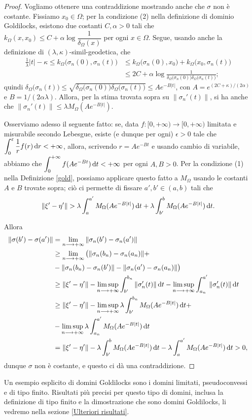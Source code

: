 \begin{proof}
    Vogliamo ottenere una contraddizione mostrando anche che $\sigma$ non è costante. Fissiamo $x_0\in\Omega$; per la condizione (2) nella definizione di dominio Goldilocks, esistono due costanti $C,\alpha>0$ tali che $k_\Omega(x,x_0) \le C+\alpha\log{\dfrac{1}{\delta_\Omega(x)}}$ per ogni $x\in\Omega$. Segue, usando anche la definizione di $(\lambda,\kappa)$-simil-geodetica, che
    \begin{align*}
        \frac{1}{\lambda}|t|-\kappa \le k_\Omega\big(\sigma_n(0),\sigma_n(t)\big) &\le k_\Omega\big(\sigma_n(0),x_0\big)+k_\Omega\big(x_0,\sigma_n(t)\big)\\
        &\le 2C+\alpha\log{\frac{1}{\delta_\Omega\big(\sigma_n(0)\big)\delta_\Omega\big(\sigma_n(t)\big)}};
    \end{align*}
    quindi $\delta_\Omega\big(\sigma_n(t)\big) \le \sqrt{\delta_\Omega\big(\sigma_n(0)\big)\delta_\Omega\big(\sigma_n(t)\big)} \le Ae^{-B|t|}$, con $A=e^{(2C+\kappa)/(2\alpha)}$ e $B=1/(2\alpha\lambda)$. Allora, per la stima trovata sopra su $\|\sigma_n'(t)\|$, si ha anche che $\|\sigma_n'(t)\| \le \lambda M_\Omega(Ae^{-B|t|})$.
    
    Osserviamo adesso il seguente fatto: se, data $f:[0,+\infty)\longrightarrow[0,+\infty)$ limitata e misurabile secondo Lebesgue, esiste (e dunque per ogni) $\epsilon>0$ tale che $\displaystyle \int_0^\varepsilon \frac{1}{r}f(r)\mathop{}\!\mathrm{d} r<+\infty$, allora, scrivendo $r=Ae^{-Bt}$ e usando cambio di variabile, abbiamo che $\displaystyle\int_0^{+\infty} f(Ae^{-Bt})\mathop{}\!\mathrm{d} t<+\infty$ per ogni $A,B>0$. Per la condizione (1) nella Definizione \ref{gold}, possiamo applicare questo fatto a $M_\Omega$ usando le costanti $A$ e $B$ trovate sopra; ciò ci permette di fissare $a',b'\in(a,b)$ tali che
    $$\|\xi'-\eta'\|>\lambda\int_a^{a'} M_\Omega(Ae^{-B|t|})\diff t+\lambda\int_{b'}^b M_\Omega(Ae^{-B|t|})\diff t.$$

    Allora
    \begin{align*}
        \|\sigma(b')-\sigma(a')\|&=\lim_{n\longrightarrow+\infty}\|\sigma_n(b')-\sigma_n(a')\| \\
        & \ge \lim_{n\longrightarrow+\infty}\big(\|\sigma_n(b_n)-\sigma_n(a_n)\|+\\
        &-\|\sigma_n(b_n)-\sigma_n(b')\|-\|\sigma_n(a')-\sigma_n(a_n)\|\big) \\
        &\ge \|\xi'-\eta'\|-\limsup_{n\longrightarrow+\infty}\int_{b'}^{b_n}\|\sigma_n'(t)\|\mathop{}\!\mathrm{d} t-\limsup_{n\longrightarrow+\infty}\int_{a_n}^{a'}\|\sigma_n'(t)\|\mathop{}\!\mathrm{d} t\\
        &\ge \|\xi'-\eta'\|-\limsup_{n\longrightarrow+\infty}\lambda\int_{b'}^{b_n}M_\Omega(Ae^{-B|t|})\mathop{}\!\mathrm{d} t+\\
        &-\limsup_{n\longrightarrow+\infty}\lambda\int_{a_n}^{a'}M_\Omega(Ae^{-B|t|})\mathop{}\!\mathrm{d} t\\
        &=\|\xi'-\eta'\|-\lambda\int_{b'}^b M_\Omega(Ae^{-B|t|})\mathop{}\!\mathrm{d} t-\lambda\int_a^{a'}M_\Omega(Ae^{-B|t|})\mathop{}\!\mathrm{d} t>0,
    \end{align*}
    dunque $\sigma$ non è costante, e questo ci dà una contraddizione.
\end{proof}

Un esempio esplicito di domini Goldilocks sono i domini limitati, pseudoconvessi e di tipo finito. Risultati più precisi per questo tipo di domini, inclusa la definizione di tipo finito e la dimostrazione che sono domini Goldilocks, li vedremo nella sezione \ref{Ulteriori risultati}.